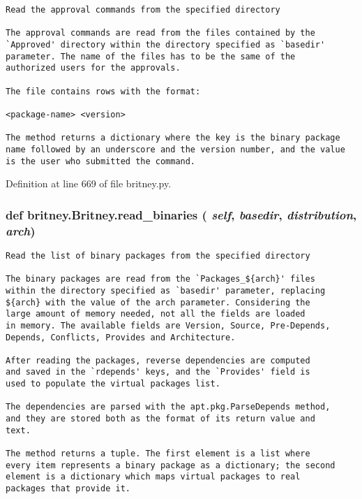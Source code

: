 \footnotesize\begin{verbatim}Read the approval commands from the specified directory

The approval commands are read from the files contained by the 
`Approved' directory within the directory specified as `basedir'
parameter. The name of the files has to be the same of the
authorized users for the approvals.

The file contains rows with the format:

<package-name> <version>

The method returns a dictionary where the key is the binary package
name followed by an underscore and the version number, and the value
is the user who submitted the command.
\end{verbatim}
\normalsize
 

Definition at line 669 of file britney.py.
\subsubsection{\setlength{\rightskip}{0pt plus 5cm}def britney.Britney.read\_\-binaries ( {\em self},  {\em basedir},  {\em distribution},  {\em arch})}\label{classbritney_1_1Britney_1b2b0f42e4af1cee472f93e955b30421}




\footnotesize\begin{verbatim}Read the list of binary packages from the specified directory

The binary packages are read from the `Packages_${arch}' files
within the directory specified as `basedir' parameter, replacing
${arch} with the value of the arch parameter. Considering the
large amount of memory needed, not all the fields are loaded
in memory. The available fields are Version, Source, Pre-Depends,
Depends, Conflicts, Provides and Architecture.

After reading the packages, reverse dependencies are computed
and saved in the `rdepends' keys, and the `Provides' field is
used to populate the virtual packages list.

The dependencies are parsed with the apt.pkg.ParseDepends method,
and they are stored both as the format of its return value and
text.

The method returns a tuple. The first element is a list where
every item represents a binary package as a dictionary; the second
element is a dictionary which maps virtual packages to real
packages that provide it.
\end{verbatim}
\normalsize
 

